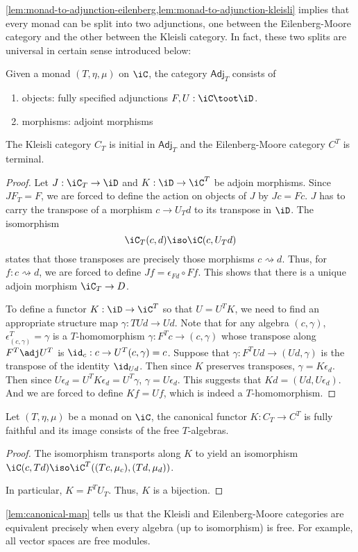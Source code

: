 \documentclass{amsart}
\begin{document}
\cref{lem:monad-to-adjunction-eilenberg,lem:monad-to-adjunction-kleisli} implies that every monad can be split into two adjunctions, one between the Eilenberg-Moore category and the other between the Kleisli category.
In fact, these two splits are universal in certain sense introduced below:

\begin{defn}
  Given a monad $(T,\eta,\mu)$ on $\iC$, the category $\mathsf{Adj}_{T}$ consists of
  \begin{enumerate}
  \item objects: fully specified adjunctions $F,U : \iC \toot \iD$.
  \item morphisms: adjoint morphisms
    
  \end{enumerate}
\end{defn}

\begin{lem}
  The Kleisli category $C_{T}$ is initial in $\mathsf{Adj}_{T}$ and the Eilenberg-Moore category $C^{T}$ is terminal.
\end{lem}
\begin{proof}
  Let $J : \iC_{T} \to \iD$ and $K : \iD \to \iC^{T}$ be adjoin morphisms.
  Since $JF_{T} = F$, we are forced to define the action on objects of $J$ by $Jc = Fc$.
  $J$ has to carry the transpose of a morphism $c \to U_{T}d$ to its transpose in $\iD$.
  The isomorphism
  \[
    \iC_{T}(c,d) \iso \iC(c,U_{T}d)
  \]
  states that those transposes are precisely those morphisms $c \rightsquigarrow d$.
  Thus, for $f : c \rightsquigarrow d$, we are forced to define $Jf = \epsilon_{Fd} \circ Ff$.
  This shows that there is a unique adjoin morphism $\iC_{T} \to D$.

  To define a functor $K : \iD \to \iC^{T}$ so that $U = U^{T}K$, we need to find an appropriate structure map $\gamma : TUd \to Ud$.
  Note that for any algebra $(c,\gamma)$, $\epsilon^{T}_{(c,\gamma)} = \gamma$ is a $T$-homomorphism $\gamma : F^{T}c \to (c,\gamma)$ whose transpose along $F^{T} \adj U^{T}$ is $\id_{c} : c \to U^{T}(c,\gamma) = c$.
  Suppose that $\gamma : F^{T}Ud \to (Ud, \gamma)$ is the transpose of the identity $\id_{Ud}$.
  Then since $K$ preserves transposes, $\gamma = K\epsilon_{d}$.
  Then since $U\epsilon_{d} = U^{T}K\epsilon_{d} = U^{T}\gamma$, $\gamma = U\epsilon_{d}$.
  This suggests that $Kd = (Ud, U\epsilon_{d})$.
  And we are forced to define $Kf = Uf$, which is indeed a $T$-homomorphism.
\end{proof}

\begin{lem}\label{lem:canonical-map}
  Let $(T, \eta, \mu)$ be a monad on $\iC$, the canonical functor $K : C_{T} \to C^{T}$ is fully faithful and its image consists of the free $T$-algebras.
\end{lem}
\begin{proof}
  The isomorphism transports along $K$ to yield an isomorphism $\iC(c,Td) \iso \iC^{T}((Tc,\mu_{c}),(Td,\mu_{d}))$.
  
  In particular, $K = F^{T}U_{T}$.
  Thus, $K$ is a bijection.
\end{proof}

\cref{lem:canonical-map} tells us that the Kleisli and Eilenberg-Moore categories are equivalent precisely when every algebra (up to isomorphism) is free.
For example, all vector spaces are free modules.



\end{document}
